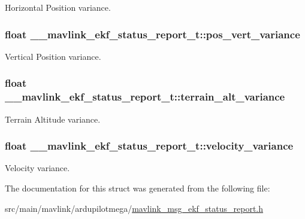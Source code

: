 Horizontal Position variance. 

\hypertarget{struct____mavlink__ekf__status__report__t_ab123603c4b46dd148d0b6fc757697f3b}{
\subsubsection[{pos\+\_\+vert\+\_\+variance}]{\setlength{\rightskip}{0pt plus 5cm}float \+\_\+\+\_\+mavlink\+\_\+ekf\+\_\+status\+\_\+report\+\_\+t\+::pos\+\_\+vert\+\_\+variance}}\label{struct____mavlink__ekf__status__report__t_ab123603c4b46dd148d0b6fc757697f3b}


Vertical Position variance. 

\hypertarget{struct____mavlink__ekf__status__report__t_a1be3f210685c23d4d46ac2173c433521}{
\subsubsection[{terrain\+\_\+alt\+\_\+variance}]{\setlength{\rightskip}{0pt plus 5cm}float \+\_\+\+\_\+mavlink\+\_\+ekf\+\_\+status\+\_\+report\+\_\+t\+::terrain\+\_\+alt\+\_\+variance}}\label{struct____mavlink__ekf__status__report__t_a1be3f210685c23d4d46ac2173c433521}


Terrain Altitude variance. 

\hypertarget{struct____mavlink__ekf__status__report__t_a2fa2b8dd778cf5e6a7781d6e322d9620}{
\subsubsection[{velocity\+\_\+variance}]{\setlength{\rightskip}{0pt plus 5cm}float \+\_\+\+\_\+mavlink\+\_\+ekf\+\_\+status\+\_\+report\+\_\+t\+::velocity\+\_\+variance}}\label{struct____mavlink__ekf__status__report__t_a2fa2b8dd778cf5e6a7781d6e322d9620}


Velocity variance. 



The documentation for this struct was generated from the following file\+:\begin{DoxyCompactItemize}
\item 
src/main/mavlink/ardupilotmega/\hyperlink{mavlink__msg__ekf__status__report_8h}{mavlink\+\_\+msg\+\_\+ekf\+\_\+status\+\_\+report.\+h}\end{DoxyCompactItemize}
